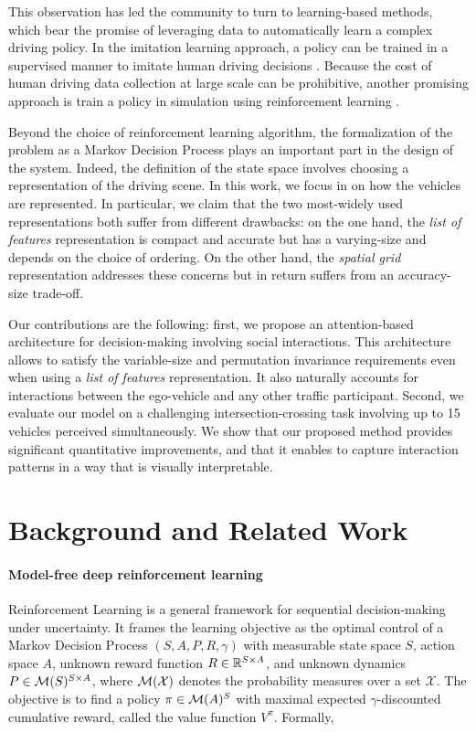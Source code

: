 \documentclass{article}
\begin{document}
This observation has led the community to turn to learning-based methods, which bear the promise of leveraging data to automatically learn a complex driving policy. In the imitation learning approach, a policy can be trained in a supervised manner to imitate human driving decisions \citep[e.g.][]{Pomerleau1989, Ross2011, Bojarski2016, Xu2016, Eraqi2017, Codevilla2017, Rehder2017c, Rezagholiradeh2018, Rhinehart2018, Bansal2018, Rhinehart2019}. Because the cost of human driving data collection at large scale can be prohibitive, another promising approach is train a policy in simulation using reinforcement learning \citep[e.g.][]{Cardamone2009, Ross2011, Mukadam2017, Chen2017, Isele_2018, Ha2018, Kendall2019}.

Beyond the choice of reinforcement learning algorithm, the formalization of the problem as a Markov Decision Process plays an important part in the design of the system. Indeed, the definition of the state space involves choosing a representation of the driving scene. In this work, we focus in on how the vehicles are represented. In particular, we claim that the two most-widely used representations both suffer from different drawbacks: on the one hand, the \emph{list of features} representation is compact and accurate but has a varying-size and depends on the choice of ordering. On the other hand, the \emph{spatial grid} representation addresses these concerns but in return suffers from an accuracy-size trade-off.

Our contributions are the following: first, we propose an attention-based architecture for decision-making involving social interactions. This architecture allows to satisfy the variable-size and permutation invariance requirements even when using a \emph{list of features} representation. It also naturally accounts for interactions between the ego-vehicle and any other traffic participant.
Second, we evaluate our model on a challenging intersection-crossing task involving up to 15 vehicles perceived simultaneously. We show that our proposed method provides significant quantitative improvements, and that it enables to capture interaction patterns in a way that is visually interpretable.

\section{Background and Related Work}

\paragraph{Model-free deep reinforcement learning} Reinforcement Learning is a general framework for sequential decision-making under uncertainty. It frames the learning objective as the optimal control of a Markov Decision Process $(S, A, P, R, \gamma)$ with measurable state space $S$, action space $A$, unknown reward function $R\in\mathbb{R}^{S \times A}$, and unknown dynamics $P\in \mathcal{M}(S)^{S \times A}$, where $\mathcal{M}(\mathcal{X})$ denotes the probability measures over a set $\mathcal{X}$. The objective is to find a policy $\pi\in\mathcal{M}(A)^S$ with maximal expected $\gamma$-discounted cumulative reward, called the value function $V^\pi$. Formally,
\end{document}
